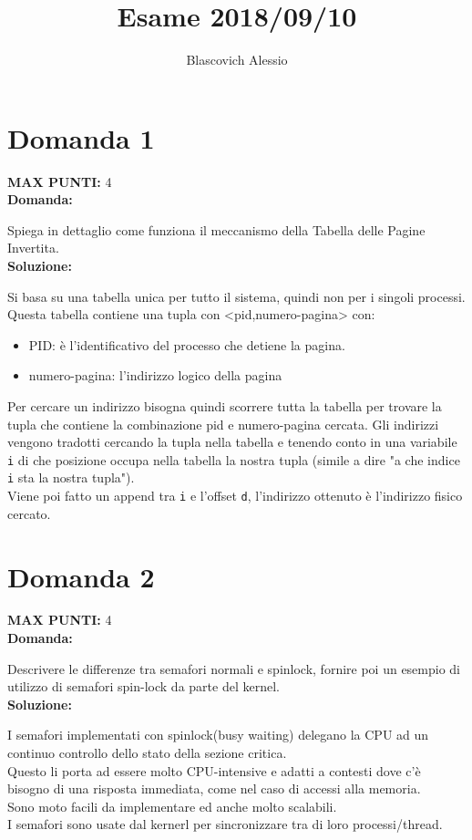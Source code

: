 \documentclass{article}
\title{Esame 2018/09/10}
\author{Blascovich Alessio}
\date{}
\begin{document}
    \maketitle
    \section*{Domanda 1}
    \textbf{MAX PUNTI:} 4\\
    \textbf{Domanda:}


    Spiega in dettaglio come funziona il meccanismo della Tabella delle Pagine Invertita.\\
    \textbf{Soluzione:}


    Si basa su una tabella unica per tutto il sistema, quindi non per i singoli processi.\\
    Questa tabella contiene una tupla con <pid,numero-pagina> con:
    \begin{itemize}
        \item PID: è l'identificativo del processo che detiene la pagina.
        \item numero-pagina: l'indirizzo logico della pagina
    \end{itemize}
    Per cercare un indirizzo bisogna quindi scorrere tutta la tabella per trovare la tupla che contiene la combinazione pid e numero-pagina cercata.
    Gli indirizzi vengono tradotti cercando la tupla nella tabella e tenendo conto in una variabile \verb+i+ di che posizione occupa nella tabella la nostra tupla (simile a dire "a che indice \verb+i+ sta la nostra tupla").\\
    Viene poi fatto un append tra \verb+i+ e l'offset \verb+d+, l'indirizzo ottenuto è l'indirizzo fisico cercato.
    \section*{Domanda 2}
    \textbf{MAX PUNTI:} 4\\
    \textbf{Domanda:}


    Descrivere le differenze tra semafori normali e spinlock, fornire poi un esempio di utilizzo di semafori spin-lock da parte del kernel.\\
    \textbf{Soluzione:}


    I semafori implementati con spinlock(busy waiting) delegano la CPU ad un continuo controllo dello stato della sezione critica.\\
    Questo li porta ad essere molto CPU-intensive e adatti a contesti dove c'è bisogno di una risposta immediata, come nel caso di accessi alla memoria.\\
    Sono moto facili da implementare ed anche molto scalabili.\\
    I semafori sono usate dal kernerl per sincronizzare tra di loro processi/thread.
\end{document}
